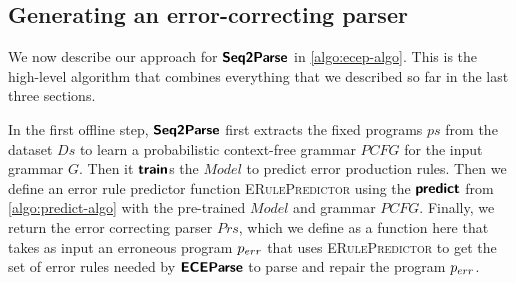 \subsection{Generating an error-correcting parser}
\label{sec:whole-system:building-ecp}



We now describe our approach for $\bm{\mathsf{Seq2Parse}}$ in \autoref{algo:ecep-algo}. This
is the high-level algorithm that combines everything that we described so far in
the last three sections.

In the first offline step, $\bm{\mathsf{Seq2Parse}}$ first extracts the fixed programs $ps$
from the dataset $Ds$ to learn a probabilistic context-free grammar $PCFG$ for
the input grammar $G$. Then it $\bm{\mathsf{train}}$s the $Model$ to predict error
production rules. Then we define an error rule predictor function
\textsc{ERulePredictor} using the $\bm{\mathsf{predict}}$ from \autoref{algo:predict-algo}
with the pre-trained $Model$ and grammar $PCFG$. Finally, we return the error
correcting parser $Prs$, which we define as a function here that takes as input
an erroneous program $p_{err}$ that uses \textsc{ERulePredictor} to get the set of
error rules needed by $\bm{\mathsf{ECEParse}}$ to parse and repair the program $p_{err}$.
